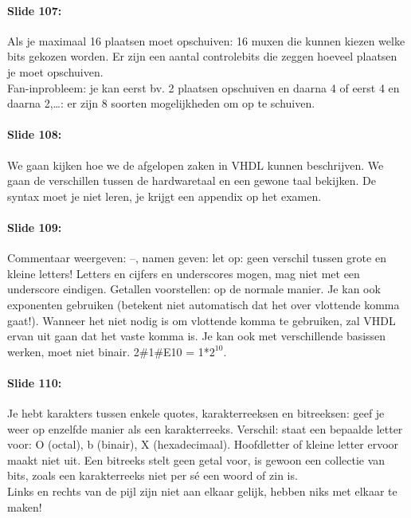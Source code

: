 \documentclass[10pt,a4paper]{book}
\begin{document}
\paragraph{Slide 107:} Als je maximaal 16 plaatsen moet opschuiven: 16 muxen die kunnen kiezen welke bits gekozen worden. Er zijn een aantal controlebits die zeggen hoeveel plaatsen je moet opschuiven.\\
Fan-inprobleem: je kan eerst bv. 2 plaatsen opschuiven en daarna 4 of eerst 4 en daarna 2,\ldots: er zijn 8 soorten mogelijkheden om op te schuiven.

\paragraph{Slide 108:} We gaan kijken hoe we de afgelopen zaken in VHDL kunnen beschrijven. We gaan de verschillen tussen de hardwaretaal en een gewone taal bekijken. De syntax moet je niet leren, je krijgt een appendix op het examen. 

\paragraph{Slide 109:} Commentaar weergeven: --, namen geven: let op: geen verschil tussen grote en kleine letters! Letters en cijfers en underscores mogen, mag niet met een underscore eindigen. Getallen voorstellen: op de normale manier. Je kan ook exponenten gebruiken (betekent niet automatisch dat het over vlottende komma gaat!). Wanneer het niet nodig is om vlottende komma te gebruiken, zal VHDL ervan uit gaan dat het vaste komma is. Je kan ook met verschillende basissen werken, moet niet binair. 2\#1\#E10 = 1*$2^10$.

\paragraph{Slide 110:} Je hebt karakters tussen enkele quotes, karakterreeksen en bitreeksen: geef je weer op enzelfde manier als een karakterreeks. Verschil: staat een bepaalde letter voor: O (octal), b (binair), X (hexadecimaal). Hoofdletter of kleine letter ervoor maakt niet uit. Een bitreeks stelt geen getal voor, is gewoon een collectie van bits, zoals een karakterreeks niet per s\'e een woord of zin is.\\
Links en rechts van de pijl zijn niet aan elkaar gelijk, hebben niks met elkaar te maken!
\end{document}
